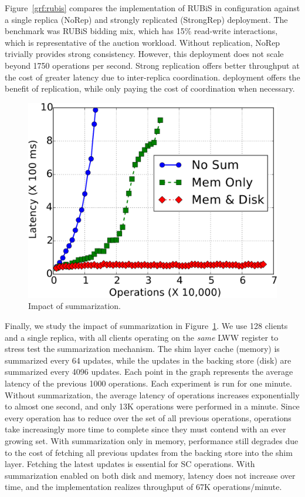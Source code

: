 Figure~\ref{grf:rubis} compares the \name implementation of RUBiS in 
configuration against a single replica (NoRep) and strongly replicated
(StrongRep)  deployment. The benchmark was RUBiS bidding mix, which has
15\% read-write interactions, which is representative of the auction workload.
Without replication, NoRep trivially provides strong consistency. However, this
deployment does not scale beyond 1750 operations per second. Strong replication
offers better throughput at the cost of greater latency due to inter-replica
coordination. \name deployment offers the benefit of replication, while only
paying the cost of coordination when necessary.

\begin{figure}
\centering
\includegraphics[width=0.75\columnwidth]{graphs/summarization.pdf}
\caption{Impact of summarization.}
\label{grf:summarization}
\end{figure}


Finally, we study the impact of summarization in
Figure~\ref{grf:summarization}. We use 128 clients and a single \name replica,
with all clients operating on the \emph{same} LWW register to stress test the
summarization mechanism. The shim layer cache (memory) is summarized every 64
updates, while the updates in the backing store (disk) are summarized every
4096 updates. Each point in the graph represents the average latency of the
previous 1000 operations. Each experiment is run for one minute.  Without
summarization, the average latency of operations increases exponentially to
almost one second, and only 13K operations were performed in a minute. Since
every operation has to reduce over the set of all previous operations,
operations take increasingly more time to complete since they must contend with
an ever growing set.  With summarization only in memory, performance still
degrades due to the cost of fetching all previous updates from the backing
store into the shim layer. Fetching the latest updates is essential for SC
operations. With summarization enabled on both disk and memory, latency does
not increase over time, and the implementation realizes throughput of 67K
operations/minute.
